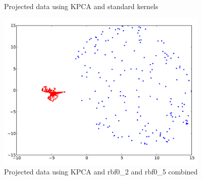 \documentclass[a4paper,11pt]{article}
\begin{document}
\begin{figure}[!ht]
  \centering
  \caption{Projected data using KPCA and standard kernels}
\end{figure}

\newpage

\begin{figure}[!ht]
  \begin{center}
  \includegraphics[width=4in]{WU7_combo.pdf}
  \caption{Projected data using KPCA and rbf0\_2 and rbf0\_5 combined}
  \label{figures:WU7_combo}
  \end{center}
\end{figure}
\end{document}
